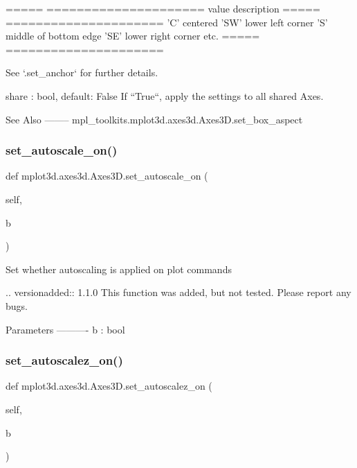 \begin{DoxyVerb}
\begin{DoxyVerb}
    =====   =====================
    value   description
    =====   =====================
    'C'     centered
    'SW'    lower left corner
    'S'     middle of bottom edge
    'SE'    lower right corner
    etc.
    =====   =====================

    See `.set_anchor` for further details.

share : bool, default: False
    If ``True``, apply the settings to all shared Axes.

See Also
--------
mpl_toolkits.mplot3d.axes3d.Axes3D.set_box_aspect
\end{DoxyVerb}
 \mbox{\label{classmplot3d_1_1axes3d_1_1Axes3D_a46c6e1170b4087eaa42fb8d31e07dba0}} 
\subsubsection{\texorpdfstring{set\+\_\+autoscale\+\_\+on()}{set\_autoscale\_on()}}
{\footnotesize\ttfamily def mplot3d.\+axes3d.\+Axes3\+D.\+set\+\_\+autoscale\+\_\+on (\begin{DoxyParamCaption}\item[{}]{self,  }\item[{}]{b }\end{DoxyParamCaption})}

\begin{DoxyVerb}Set whether autoscaling is applied on plot commands

.. versionadded:: 1.1.0
    This function was added, but not tested. Please report any bugs.

Parameters
----------
b : bool
\end{DoxyVerb}
 \mbox{\label{classmplot3d_1_1axes3d_1_1Axes3D_a7e9aa85500363d6b581196c0b720a2d0}} 
\subsubsection{\texorpdfstring{set\+\_\+autoscalez\+\_\+on()}{set\_autoscalez\_on()}}
{\footnotesize\ttfamily def mplot3d.\+axes3d.\+Axes3\+D.\+set\+\_\+autoscalez\+\_\+on (\begin{DoxyParamCaption}\item[{}]{self,  }\item[{}]{b }\end{DoxyParamCaption})}


\end{DoxyVerb}
